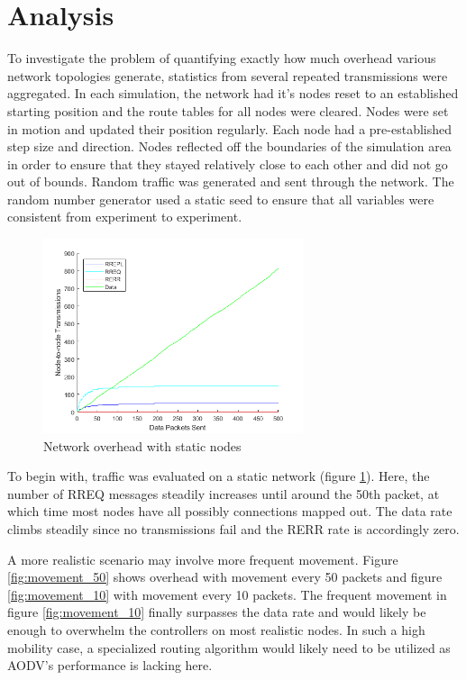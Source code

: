 \documentclass[conference]{IEEEtran}
\begin{document}
\section{Analysis}

To investigate the problem of quantifying exactly how much overhead various network topologies generate, statistics from several repeated transmissions were aggregated. In each simulation, the network had it's nodes reset to an established starting position and the route tables for all nodes were cleared. Nodes were set in motion and updated their position regularly. Each node had a pre-established step size and direction. Nodes reflected off the boundaries of the simulation area in order to ensure that they stayed relatively close to each other and did not go out of bounds. Random traffic was generated and sent through the network. The random number generator used a static seed to ensure that all variables were consistent from experiment to experiment. 

\begin{figure}[ht]
	\centering
	\includegraphics[width=3in]{movement_none.png}
	\caption{Network overhead with static nodes}
	\label{fig:movement_none}
\end{figure}

To begin with, traffic was evaluated on a static network (figure \ref{fig:movement_none}).
Here, the number of RREQ messages steadily increases until around the 50th packet, at which time most nodes have all possibly connections mapped out. The data rate climbs steadily since no transmissions fail and the RERR rate is accordingly zero.

A more realistic scenario may involve more frequent movement. Figure \ref{fig:movement_50} shows overhead with movement every 50 packets and figure \ref{fig:movement_10} with movement every 10 packets. The frequent movement in figure \ref{fig:movement_10} finally surpasses the data rate and would likely be enough to overwhelm the controllers on most realistic nodes. In such a high mobility case, a specialized routing algorithm would likely need to be utilized as AODV's performance is lacking here.
\end{document}
